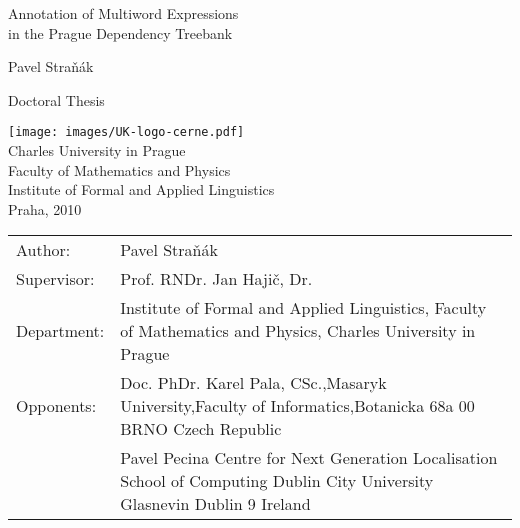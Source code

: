 \documentclass[11pt, a4paper, twopage, titlepage]{book}
\begin{document}
\begin{titlepage}
\setlength\voffset{4cm}
\centering

{\fontsize{21}{32}\selectfont
Annotation of Multiword Expressions \\[3mm]
 in the Prague Dependency Treebank }
\vspace{3cm}

\fontsize{18}{18}\selectfont Pavel Straňák
\vspace{3cm}

\Large  Doctoral Thesis\\
\vspace{2cm}

\texttt{[image: images/UK-logo-cerne.pdf]}\\
\bigskip
Charles University in Prague\\
Faculty of Mathematics and Physics\\
Institute of Formal and Applied Linguistics\\
\vspace{0.8cm}
Praha, 2010
\end{titlepage}

\phantom{nic}
\thispagestyle{empty}

\begin{table}[htdp]
\begin{center}
\begin{tabular}{lp{7cm}}
Author: & Pavel Straňák \\[1cm]
Supervisor: & Prof. RNDr. Jan Hajič, Dr. \\[1cm]
Department: & Institute of Formal and Applied Linguistics, Faculty of Mathematics and Physics, Charles University in Prague\\[1cm]
Opponents: & 
Doc. PhDr. Karel Pala, CSc.,\newline Masaryk University,\newline Faculty of Informatics,\newline Botanicka 68a\newline 602 00 BRNO \newline Czech Republic \\[0.5cm]
               & Pavel Pecina\newline
Centre for Next Generation Localisation\newline
School of Computing\newline
Dublin City University\newline
Glasnevin\newline
Dublin 9\newline
Ireland\\
\end{tabular}
\end{center}
\label{default}
\end{table}%
\end{document}
